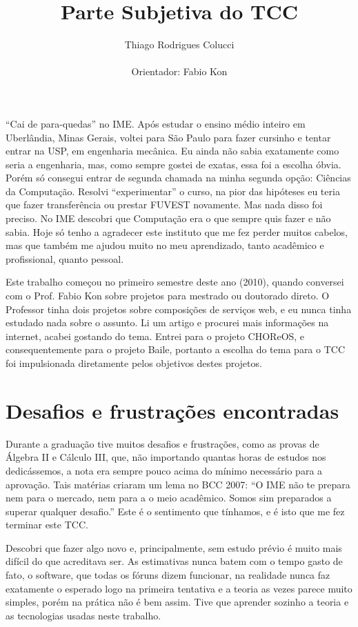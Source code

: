 \documentclass[11pt,a4paper]{article}
\title{Parte Subjetiva do TCC}
\author{Thiago Rodrigues Colucci\\\\Orientador: Fabio Kon}
\begin{document}
\maketitle

\newpage

``Cai de para-quedas'' no IME. Após estudar o ensino médio inteiro em Uberlândia, Minas Gerais, voltei para São Paulo para fazer cursinho e tentar entrar na USP, em engenharia mecânica. Eu ainda não sabia exatamente como seria a engenharia, mas, como sempre gostei de exatas, essa foi a escolha óbvia. Porém só consegui entrar de segunda chamada na minha segunda opção: Ciências da Computação. Resolvi ``experimentar'' o curso, na pior das hipóteses eu teria que fazer transferência ou prestar FUVEST novamente. Mas nada disso foi preciso. No IME descobri que Computação era o que sempre quis fazer e não sabia. Hoje só tenho a agradecer este instituto que me fez perder muitos cabelos, mas que também me ajudou muito no meu aprendizado, tanto acadêmico e profissional, quanto pessoal.

Este trabalho começou no primeiro semestre deste ano (2010), quando conversei com o Prof. Fabio Kon sobre projetos para mestrado ou doutorado direto. O Professor tinha dois projetos sobre composições de serviços web, e eu nunca tinha estudado nada sobre o assunto. Li um artigo e procurei mais informações na internet, acabei gostando do tema. Entrei para o projeto CHOReOS, e consequentemente para o projeto Baile, portanto a escolha do tema para o TCC foi impulsionada diretamente pelos objetivos destes projetos.





\section{ Desafios e frustrações encontradas}
Durante a graduação tive muitos desafios e frustrações, como as provas de Álgebra II e Cálculo III, que, não importando quantas horas de estudos nos dedicássemos, a nota era sempre pouco acima do mínimo necessário para a aprovação. Tais matérias criaram um lema no BCC 2007: ``O IME não te prepara nem para o mercado, nem para a o meio acadêmico. Somos sim preparados a superar qualquer desafio.'' Este é o sentimento que tínhamos, e é isto que me fez terminar este TCC. 

Descobri que fazer algo novo e, principalmente, sem estudo prévio é muito mais difícil do que acreditava ser. As estimativas nunca batem com o tempo gasto de fato, o software, que todas os fóruns dizem funcionar, na realidade nunca faz exatamente o esperado logo na primeira tentativa e a teoria as vezes parece muito simples, porém na prática não é bem assim. Tive que aprender sozinho a teoria e as tecnologias usadas neste trabalho.
\end{document}
